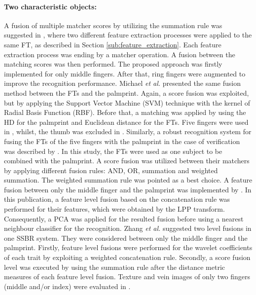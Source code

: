 \documentclass[review]{elsarticle}
\begin{document}
	\paragraph{\textbf{Two characteristic objects:}} A fusion of multiple matcher scores by utilizing the summation rule was suggested in \cite{nanni2009multi}, where two different feature extraction processes were applied to the same FT, as described in Section \ref{sub:feature_extraction}. Each feature extraction process was ending by a matcher operation. A fusion between the matching scores was then performed. The proposed approach was firstly implemented for only middle fingers. After that, ring fingers were augmented to improve the recognition performance. Michael \textit{et al.} \cite{Michael2010Robust,michael2010innovative} presented the same fusion method between the FTs and the palmprint. Again, a score fusion was exploited, but by applying the Support Vector Machine (SVM) technique with the kernel of Radial Basis Function (RBF). Before that, a matching was applied by using the HD for the palmprint and Euclidean distance for the FTs. Five fingers were used in \cite{Michael2010Robust}, whilst, the thumb was excluded in \cite{michael2010innovative}. 
	Similarly, a robust recognition system for fusing the FTs of the five fingers with the palmprint in the case of verification was described by \cite{Goh2010Bi-modal}. In this study, the FTs were used as one subject to be combined with the palmprint. A score fusion was utilized between their matchers by applying different fusion rules: AND, OR, summation and weighted summation. The weighted summation rule was pointed as a best choice. A feature fusion between only the middle finger and the palmprint was implemented by \cite{Zhang2010hand}. In this publication, a feature level fusion based on the concatenation rule was performed for their features, which were obtained by the LPP transform. Consequently, a PCA was applied for the resulted fusion before using a nearest neighbour classifier for the recognition. Zhang \textit{et al.} \cite{zhang2012hand} suggested two level fusions in one SSBR system. They were considered between only the middle finger and the palmprint. Firstly, feature level fusions were performed for the wavelet coefficients of each trait by exploiting a weighted concatenation rule. Secondly, a score fusion level was executed by using the summation rule after the distance metric measures of each feature level fusion. Texture and vein images of only two fingers (middle and/or index) were evaluated in \cite{Kumar2012Human}. 
\end{document}
